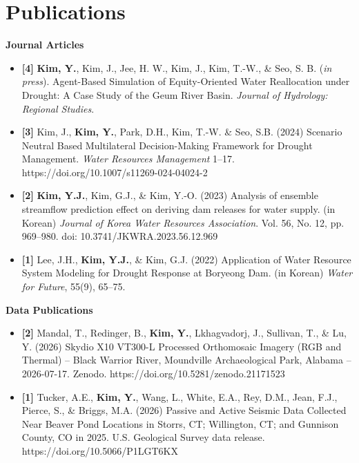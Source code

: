 \section{Publications}

\vspace{-1.5em}

\noindent\textbf{Journal Articles}
\begin{itemize}
    \item[]\textbf{[4]} \textbf{Kim, Y.}, Kim, J., Jee, H. W., Kim, J., Kim, T.-W., \& Seo, S. B. (\textit{in press}). Agent-Based Simulation of Equity-Oriented Water Reallocation under Drought: A Case Study of the Geum River Basin. \textit{Journal of Hydrology: Regional Studies}.
    
    \item[]\textbf{[3]} Kim, J., \textbf{Kim, Y.}, Park, D.H., Kim, T.-W. \& Seo, S.B. (2024) Scenario Neutral Based Multilateral Decision-Making Framework for Drought Management. \textit{Water Resources Management} 1--17. https://doi.org/10.1007/s11269-024-04024-2

    \item[]\textbf{[2]} \textbf{Kim, Y.J.}, Kim, G.J., \& Kim, Y.-O. (2023) Analysis of ensemble streamflow prediction effect on deriving dam releases for water supply. (in Korean) \textit{Journal of Korea Water Resources Association}. Vol. 56, No. 12, pp. 969--980. doi: 10.3741/JKWRA.2023.56.12.969

    \item[]\textbf{[1]} Lee, J.H., \textbf{Kim, Y.J.}, \& Kim, G.J. (2022) Application of Water Resource System Modeling for Drought Response at Boryeong Dam. (in Korean) \textit{Water for Future}, 55(9), 65--75.
\end{itemize}
\vspace{1em}
\noindent\textbf{Data Publications}
\begin{itemize}
    \item[]\textbf{[2]} Mandal, T., Redinger, B., \textbf{Kim, Y.}, Lkhagvadorj, J., Sullivan, T., \& Lu, Y. (2026) Skydio X10 VT300-L Processed Orthomosaic Imagery (RGB and Thermal) -- Black Warrior River, Moundville Archaeological Park, Alabama -- 2026-07-17. Zenodo. https://doi.org/10.5281/zenodo.21171523

    \item[]\textbf{[1]} Tucker, A.E., \textbf{Kim, Y.}, Wang, L., White, E.A., Rey, D.M., Jean, F.J., Pierce, S., \& Briggs, M.A. (2026) Passive and Active Seismic Data Collected Near Beaver Pond Locations in Storrs, CT; Willington, CT; and Gunnison County, CO in 2025. U.S. Geological Survey data release. https://doi.org/10.5066/P1LGT6KX
\end{itemize}
